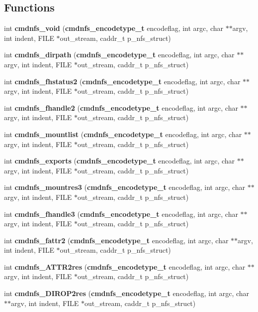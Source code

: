 \subsection*{Functions}
\begin{CompactItemize}
\item 
int {\bf cmdnfs\_\-void} ({\bf cmdnfs\_\-encodetype\_\-t} encodeflag, int argc, char $\ast$$\ast$argv, int indent, FILE $\ast$out\_\-stream, caddr\_\-t p\_\-nfs\_\-struct)
\item 
int {\bf cmdnfs\_\-dirpath} ({\bf cmdnfs\_\-encodetype\_\-t} encodeflag, int argc, char $\ast$$\ast$argv, int indent, FILE $\ast$out\_\-stream, caddr\_\-t p\_\-nfs\_\-struct)
\item 
int {\bf cmdnfs\_\-fhstatus2} ({\bf cmdnfs\_\-encodetype\_\-t} encodeflag, int argc, char $\ast$$\ast$argv, int indent, FILE $\ast$out\_\-stream, caddr\_\-t p\_\-nfs\_\-struct)
\item 
int {\bf cmdnfs\_\-fhandle2} ({\bf cmdnfs\_\-encodetype\_\-t} encodeflag, int argc, char $\ast$$\ast$argv, int indent, FILE $\ast$out\_\-stream, caddr\_\-t p\_\-nfs\_\-struct)
\item 
int {\bf cmdnfs\_\-mountlist} ({\bf cmdnfs\_\-encodetype\_\-t} encodeflag, int argc, char $\ast$$\ast$argv, int indent, FILE $\ast$out\_\-stream, caddr\_\-t p\_\-nfs\_\-struct)
\item 
int {\bf cmdnfs\_\-exports} ({\bf cmdnfs\_\-encodetype\_\-t} encodeflag, int argc, char $\ast$$\ast$argv, int indent, FILE $\ast$out\_\-stream, caddr\_\-t p\_\-nfs\_\-struct)
\item 
int {\bf cmdnfs\_\-mountres3} ({\bf cmdnfs\_\-encodetype\_\-t} encodeflag, int argc, char $\ast$$\ast$argv, int indent, FILE $\ast$out\_\-stream, caddr\_\-t p\_\-nfs\_\-struct)
\item 
int {\bf cmdnfs\_\-fhandle3} ({\bf cmdnfs\_\-encodetype\_\-t} encodeflag, int argc, char $\ast$$\ast$argv, int indent, FILE $\ast$out\_\-stream, caddr\_\-t p\_\-nfs\_\-struct)
\item 
int {\bf cmdnfs\_\-fattr2} ({\bf cmdnfs\_\-encodetype\_\-t} encodeflag, int argc, char $\ast$$\ast$argv, int indent, FILE $\ast$out\_\-stream, caddr\_\-t p\_\-nfs\_\-struct)
\item 
int {\bf cmdnfs\_\-ATTR2res} ({\bf cmdnfs\_\-encodetype\_\-t} encodeflag, int argc, char $\ast$$\ast$argv, int indent, FILE $\ast$out\_\-stream, caddr\_\-t p\_\-nfs\_\-struct)
\item 
int {\bf cmdnfs\_\-DIROP2res} ({\bf cmdnfs\_\-encodetype\_\-t} encodeflag, int argc, char $\ast$$\ast$argv, int indent, FILE $\ast$out\_\-stream, caddr\_\-t p\_\-nfs\_\-struct)
$$
\end{CompactItemize}
